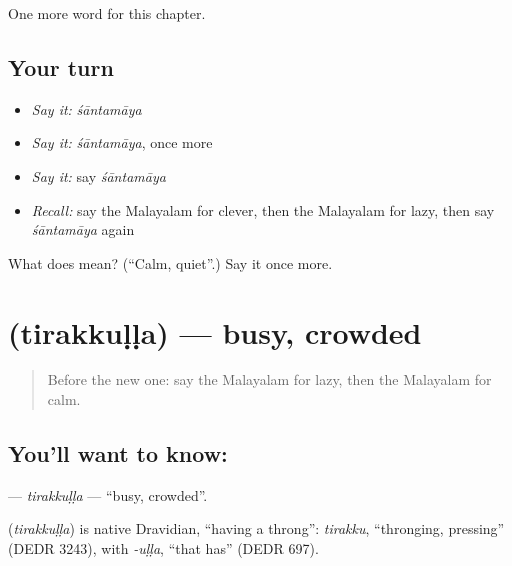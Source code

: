 \begin{grammarlens}[title={What you've built}]
One more word for this chapter.
\end{grammarlens}

\subsection*{Your turn}
\begin{itemize}
\raggedright
  \item \emph{Say it:} \emph{śāntamāya}
  \item \emph{Say it:} \emph{śāntamāya}, once more
  \item \emph{Say it:} say \emph{śāntamāya}
  \item \emph{Recall:} say the Malayalam for clever, then the Malayalam for lazy, then say \emph{śāntamāya} again
\end{itemize}

\begin{tcolorbox}[breakable,colback=teal!4,colframe=teal!35!black,title={Before you move on}]
What does  mean? (\textquotedblleft{}Calm, quiet\textquotedblright{}.) Say it once more.
\end{tcolorbox}
\section[\texorpdfstring{\ml{തിരക്കുള്ള} (tirakkuḷḷa)}{തിരക്കുള്ള (tirakkuḷḷa)}]{ (tirakkuḷḷa) — busy, crowded}

\label{lesson:ML-C169-tirakkulla}



\begin{quote}
Before the new one: say the Malayalam for lazy, then the Malayalam for calm.
\end{quote}

\subsection*{You'll want to know: }
\textbf{} — \emph{tirakkuḷḷa} — \textquotedblleft{}busy, crowded\textquotedblright{}.

\begin{cousinweb}
\textbf{} (\emph{tirakkuḷḷa}) is native Dravidian, \textquotedblleft{}having a throng\textquotedblright{}: \emph{tirakku}, \textquotedblleft{}thronging, pressing\textquotedblright{} (DEDR 3243), with \emph{-uḷḷa}, \textquotedblleft{}that has\textquotedblright{} (DEDR 697).
\end{cousinweb}

